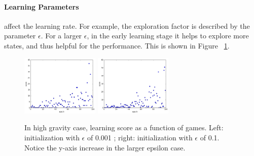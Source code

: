 \documentclass[11pt]{article}
\begin{document}
\paragraph{Learning Parameters} affect the learning rate. For example, the exploration factor is described by the parameter $\epsilon$. For a larger $\epsilon$, in the early learning stage it helps to explore more states, and thus helpful for the performance. This is shown in Figure ~\ref{Qepsilon}.
\begin{figure}[] 
\centering
        \includegraphics[width=0.33\textwidth]{Plot/learn_vel5_mtop25.png}
        \includegraphics[width=0.33\textwidth]{Plot/learn_epsilon01.png}
        \caption{In high gravity case, learning score as a function of games. Left: initialization with $\epsilon$ of 0.001 ; right: initialization with $\epsilon$ of 0.1. Notice the y-axis increase in the larger epsilon case.}
            \label{Qepsilon}
\end{figure}
\end{document}
